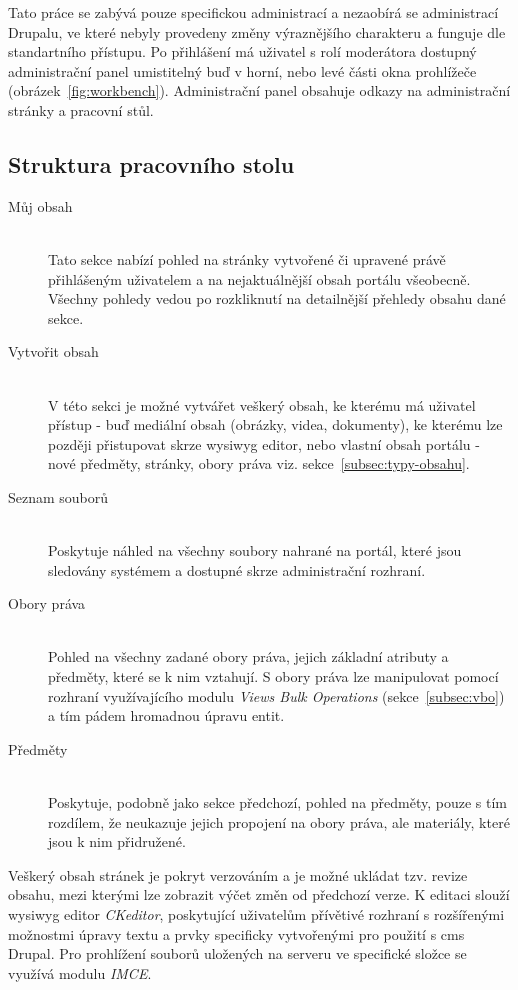 Tato práce se zabývá pouze specifickou administrací a nezaobírá se administrací Drupalu, ve které nebyly provedeny změny výraznějšího charakteru a funguje dle standartního přístupu. Po přihlášení má uživatel s rolí moderátora dostupný administrační panel umistitelný buď v horní, nebo levé části okna prohlížeče (obrázek~\ref{fig:workbench}). Administrační panel obsahuje odkazy na administrační stránky a pracovní stůl. 

\subsection*{Struktura pracovního stolu}
\begin{description}
  \item[Můj obsah] \hfill \\
  Tato sekce nabízí pohled na stránky vytvořené či upravené právě přihlášeným uživatelem a na nejaktuálnější obsah portálu všeobecně. Všechny pohledy vedou po rozkliknutí na detailnější přehledy obsahu dané sekce.  
  \item [Vytvořit obsah] \hfill \\
  V této sekci je možné vytvářet veškerý obsah, ke kterému má uživatel přístup - buď mediální obsah (obrázky, videa, dokumenty), ke kterému lze později přistupovat skrze \gls{wysiwyg} editor, nebo vlastní obsah portálu - nové předměty, stránky, obory práva viz. sekce~\ref{subsec:typy-obsahu}.
  \item [Seznam souborů] \hfill \\
  Poskytuje náhled na všechny soubory nahrané na portál, které jsou sledovány systémem a dostupné skrze administrační rozhraní.
  \item [Obory práva] \hfill \\
  Pohled na všechny zadané obory práva, jejich základní atributy a předměty, které se k nim vztahují. S obory práva lze manipulovat pomocí rozhraní využívajícího modulu \emph{Views Bulk Operations} (sekce~\ref{subsec:vbo}) a tím pádem hromadnou úpravu entit.
  \item [Předměty] \hfill \\
  Poskytuje, podobně jako sekce předchozí, pohled na předměty, pouze s tím rozdílem, že neukazuje jejich propojení na obory práva, ale materiály, které jsou k nim přidružené.
\end{description}

Veškerý obsah stránek je pokryt verzováním a je možné ukládat tzv. revize obsahu, mezi kterými lze zobrazit výčet změn od předchozí verze. K editaci slouží \gls{wysiwyg} editor \emph{CKeditor}, poskytující uživatelům přívětivé rozhraní s rozšířenými možnostmi úpravy textu a prvky specificky vytvořenými pro použití s \gls{cms} Drupal. Pro prohlížení souborů uložených na serveru ve specifické složce se využívá modulu \emph{IMCE}.

